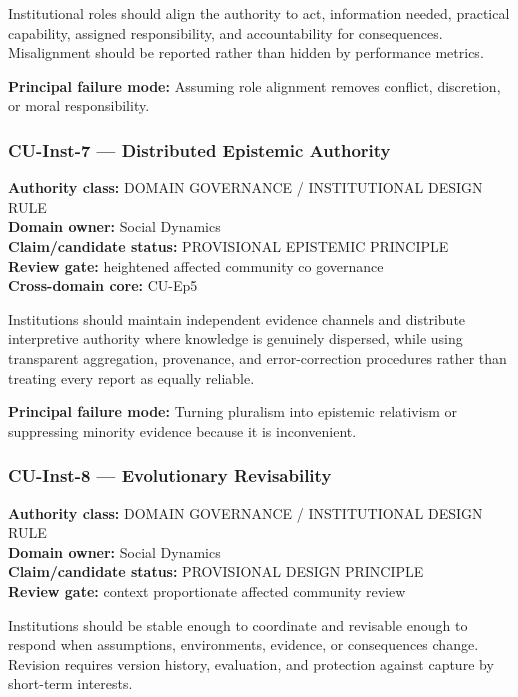 \documentclass[
  11pt,
]{article}
\begin{document}
Institutional roles should align the authority to act, information
needed, practical capability, assigned responsibility, and
accountability for consequences. Misalignment should be reported rather
than hidden by performance metrics.

\textbf{Principal failure mode:} Assuming role alignment removes
conflict, discretion, or moral responsibility.

\subsubsection{CU-Inst-7 --- Distributed Epistemic
Authority}\label{cu-inst-7-distributed-epistemic-authority}

\textbf{Authority class:} DOMAIN GOVERNANCE / INSTITUTIONAL DESIGN
RULE\\
\textbf{Domain owner:} Social Dynamics\\
\textbf{Claim/candidate status:} PROVISIONAL EPISTEMIC PRINCIPLE\\
\textbf{Review gate:} heightened affected community co governance\\
\textbf{Cross-domain core:} CU-Ep5

Institutions should maintain independent evidence channels and
distribute interpretive authority where knowledge is genuinely
dispersed, while using transparent aggregation, provenance, and
error-correction procedures rather than treating every report as equally
reliable.

\textbf{Principal failure mode:} Turning pluralism into epistemic
relativism or suppressing minority evidence because it is inconvenient.

\subsubsection{CU-Inst-8 --- Evolutionary
Revisability}\label{cu-inst-8-evolutionary-revisability}

\textbf{Authority class:} DOMAIN GOVERNANCE / INSTITUTIONAL DESIGN
RULE\\
\textbf{Domain owner:} Social Dynamics\\
\textbf{Claim/candidate status:} PROVISIONAL DESIGN PRINCIPLE\\
\textbf{Review gate:} context proportionate affected community review

Institutions should be stable enough to coordinate and revisable enough
to respond when assumptions, environments, evidence, or consequences
change. Revision requires version history, evaluation, and protection
against capture by short-term interests.
\end{document}
